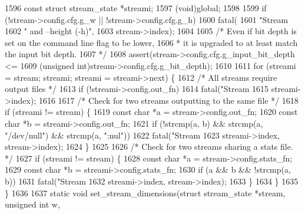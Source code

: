 \begin{DoxyCodeInclude}
{{{{{{{{{{{{{{{{{{{{{1596   \textcolor{keyword}{const} \textcolor{keyword}{struct }stream\_state *streami;
1597   (void)global;
1598 
1599   \textcolor{keywordflow}{if} (!stream->config.cfg.g\_w || !stream->config.cfg.g\_h)
1600     fatal(
1601         \textcolor{stringliteral}{"Stream %
1602         \textcolor{stringliteral}{" and --height (-h)"},
1603         stream->index);
1604 
1605   \textcolor{comment}{/* Even if bit depth is set on the command line flag to be lower,}
1606 \textcolor{comment}{   * it is upgraded to at least match the input bit depth.}
1607 \textcolor{comment}{   */}
1608   assert(stream->config.cfg.g\_input\_bit\_depth <=
1609          (\textcolor{keywordtype}{unsigned} \textcolor{keywordtype}{int})stream->config.cfg.g\_bit\_depth);
1610 
1611   \textcolor{keywordflow}{for} (streami = stream; streami; streami = streami->next) \{
1612     \textcolor{comment}{/* All streams require output files */}
1613     \textcolor{keywordflow}{if} (!streami->config.out\_fn)
1614       fatal(\textcolor{stringliteral}{"Stream %
1615             streami->index);
1616 
1617     \textcolor{comment}{/* Check for two streams outputting to the same file */}
1618     \textcolor{keywordflow}{if} (streami != stream) \{
1619       \textcolor{keyword}{const} \textcolor{keywordtype}{char} *a = stream->config.out\_fn;
1620       \textcolor{keyword}{const} \textcolor{keywordtype}{char} *b = streami->config.out\_fn;
1621       \textcolor{keywordflow}{if} (!strcmp(a, b) && strcmp(a, \textcolor{stringliteral}{"/dev/null"}) && strcmp(a, \textcolor{stringliteral}{":nul"}))
1622         fatal(\textcolor{stringliteral}{"Stream %
1623               streami->index, stream->index);
1624     \}
1625 
1626     \textcolor{comment}{/* Check for two streams sharing a stats file. */}
1627     \textcolor{keywordflow}{if} (streami != stream) \{
1628       \textcolor{keyword}{const} \textcolor{keywordtype}{char} *a = stream->config.stats\_fn;
1629       \textcolor{keyword}{const} \textcolor{keywordtype}{char} *b = streami->config.stats\_fn;
1630       \textcolor{keywordflow}{if} (a && b && !strcmp(a, b))
1631         fatal(\textcolor{stringliteral}{"Stream %
1632               streami->index, stream->index);
1633     \}
1634   \}
1635 \}
1636 
1637 \textcolor{keyword}{static} \textcolor{keywordtype}{void} set\_stream\_dimensions(\textcolor{keyword}{struct} stream\_state *stream, \textcolor{keywordtype}{unsigned} \textcolor{keywordtype}{int} w,
}}}}}}}}}}}}}}}}}}}}}}}}}
\end{DoxyCodeInclude}
